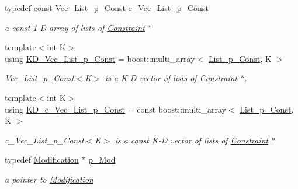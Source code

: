 \begin{DoxyCompactItemize}
typedef const \mbox{\hyperlink{group___constraint___t_y_p_e_s_gaa409095a6d6a88da1046314c1752d89d}{Vec\+\_\+\+List\+\_\+p\+\_\+\+Const}} \mbox{\hyperlink{group___constraint___t_y_p_e_s_gad1364b959a8189267f88e2a32a6dd822}{c\+\_\+\+Vec\+\_\+\+List\+\_\+p\+\_\+\+Const}}
\begin{DoxyCompactList}\small\item\em a const 1-\/D array of lists of \mbox{\hyperlink{class_s_m_spp__di__unipi__it_1_1_constraint}{Constraint}} $\ast$ \end{DoxyCompactList}\item 
{\footnotesize template$<$int K$>$ }\\using \mbox{\hyperlink{group___constraint___t_y_p_e_s_ga2f18f39226105e5ccb6059bf22c43c9c}{K\+D\+\_\+\+Vec\+\_\+\+List\+\_\+p\+\_\+\+Const}} = boost\+::multi\+\_\+array$<$ \mbox{\hyperlink{group___constraint___t_y_p_e_s_gaa56320d40c626389a8a4ce4b5a4fb0a8}{List\+\_\+p\+\_\+\+Const}}, K $>$
\begin{DoxyCompactList}\small\item\em Vec\+\_\+\+List\+\_\+p\+\_\+\+Const$<$\+K$>$ is a K-\/D vector of lists of \mbox{\hyperlink{class_s_m_spp__di__unipi__it_1_1_constraint}{Constraint}} $\ast$. \end{DoxyCompactList}\item 
{\footnotesize template$<$int K$>$ }\\using \mbox{\hyperlink{group___constraint___t_y_p_e_s_gab33537bc99eb8f3e8510dbad57552e6b}{K\+D\+\_\+c\+\_\+\+Vec\+\_\+\+List\+\_\+p\+\_\+\+Const}} = const boost\+::multi\+\_\+array$<$ \mbox{\hyperlink{group___constraint___t_y_p_e_s_gaa56320d40c626389a8a4ce4b5a4fb0a8}{List\+\_\+p\+\_\+\+Const}}, K $>$
\begin{DoxyCompactList}\small\item\em c\+\_\+\+Vec\+\_\+\+List\+\_\+p\+\_\+\+Const$<$\+K$>$ is a const K-\/D vector of lists of \mbox{\hyperlink{class_s_m_spp__di__unipi__it_1_1_constraint}{Constraint}} $\ast$ \end{DoxyCompactList}\item 
typedef \mbox{\hyperlink{class_s_m_spp__di__unipi__it_1_1_modification}{Modification}} $\ast$ \mbox{\hyperlink{group___modification___t_y_p_e_s_ga0cc1ca46966ce3aebbe7f109241baf66}{p\+\_\+\+Mod}}
\begin{DoxyCompactList}\small\item\em a pointer to \mbox{\hyperlink{class_s_m_spp__di__unipi__it_1_1_modification}{Modification}} \end{DoxyCompactList}\item 

\end{DoxyCompactItemize}
